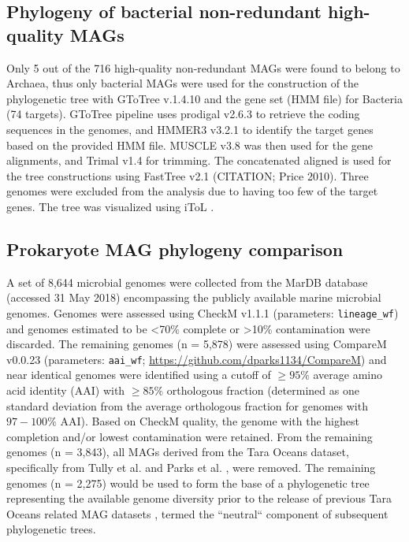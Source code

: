 \documentclass[12pt]{article}
\numberwithin{equation}{section}
\begin{document}
\subsection*{Phylogeny of bacterial non-redundant high-quality MAGs}
Only 5 out of the 716 high-quality non-redundant MAGs were found to belong to Archaea, thus only bacterial MAGs were used for the construction of the phylogenetic tree with GToTree v.1.4.10 \citep{Lee_2019} and the gene set (HMM file) for Bacteria (74 targets). GToTree pipeline uses prodigal v2.6.3 \citep{Hyatt_2010} to retrieve the coding sequences in the genomes, and HMMER3 v3.2.1 \citep{Eddy_2011} to identify the target genes based on the provided HMM file. MUSCLE v3.8 \citep{Edgar_2004} was then used for the gene alignments, and Trimal v1.4  \citep{Capella_Gutierrez_2009} for trimming. The concatenated aligned is used for the tree constructions using FastTree v2.1 (CITATION; Price 2010). Three genomes were excluded from the analysis due to having too few of the target genes. The tree was visualized using iToL \citep{Letunic2016Interactive}.

\subsection*{Prokaryote MAG phylogeny comparison} 
A set of 8,644 microbial genomes were collected from the MarDB database \citep{Klemetsen:2017fg}(accessed 31 May 2018) encompassing the publicly available marine microbial genomes. Genomes were assessed using CheckM 
v1.1.1 \citep{Parks2015CheckM}(parameters: \texttt{lineage\_wf}) and genomes estimated to be <70\% complete or >10\% contamination were discarded. The remaining genomes (n = 5,878) were assessed using CompareM v0.0.23
(parameters: \texttt{aai\_wf}; \url{https://github.com/dparks1134/CompareM}) and near identical genomes were identified using a cutoff of $\geq 95\%$ average amino acid identity (AAI) with $\geq 85\%$ orthologous fraction (determined as one standard deviation from the average orthologous fraction for genomes with $97-100\%$ AAI).
Based on CheckM quality, the genome with the highest completion and/or lowest contamination were retained. From the remaining genomes (n = 3,843), all MAGs derived from the Tara Oceans dataset, specifically from Tully et al. \citet{Tully2018reconstruction} and Parks et al. \citet{Parks2017Recovery}, were removed. The remaining genomes (n = 2,275) would be used to form the base of a phylogenetic tree representing the available genome diversity prior to the release of previous Tara Oceans related MAG datasets \citet{Tully2018reconstruction, Parks2017Recovery, Delmont2018Nitrogen-fixing}, termed the ``neutral`` component of subsequent phylogenetic trees.
\end{document}
